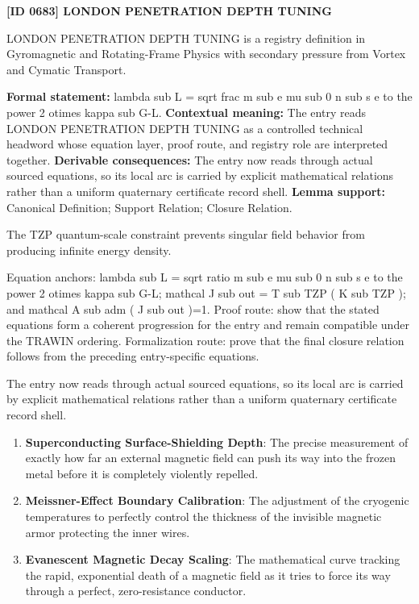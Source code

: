\clearpage
\noindent\textbf{[ID 0683] LONDON PENETRATION DEPTH TUNING}\par
\vspace{0.35em}
\begingroup\small
{}
LONDON PENETRATION DEPTH TUNING is a registry definition in Gyromagnetic and Rotating-Frame Physics with secondary pressure from Vortex and Cymatic Transport.

\begingroup\footnotesize\setlength{\emergencystretch}{3em}\sloppy
\textbf{Formal statement:} lambda sub L = sqrt frac m sub e mu sub 0 n sub s e to the power 2 otimes kappa sub G-L. \textbf{Contextual meaning:} The entry reads LONDON PENETRATION DEPTH TUNING as a controlled technical headword whose equation layer, proof route, and registry role are interpreted together. \textbf{Derivable consequences:} The entry now reads through actual sourced equations, so its local arc is carried by explicit mathematical relations rather than a uniform quaternary certificate record shell. \textbf{Lemma support:} Canonical Definition; Support Relation; Closure Relation.\par
\endgroup

The TZP quantum-scale constraint prevents singular field behavior from producing infinite energy density.

Equation anchors: lambda sub L = sqrt ratio m sub e mu sub 0 n sub s e to the power 2 otimes kappa sub G-L; mathcal J sub out = T sub TZP ( K sub TZP ); and mathcal A sub adm ( J sub out )=1. Proof route: show that the stated equations form a coherent progression for the entry and remain compatible under the TRAWIN ordering. Formalization route: prove that the final closure relation follows from the preceding entry-specific equations.

The entry now reads through actual sourced equations, so its local arc is carried by explicit mathematical relations rather than a uniform quaternary certificate record shell.
\endgroup

\begin{enumerate}[leftmargin=1.6em,itemsep=6pt,topsep=4pt]
\item \textbf{Superconducting Surface-Shielding Depth}: The precise measurement of exactly how far an external magnetic field can push its way into the frozen metal before it is completely violently repelled.
\item \textbf{Meissner-Effect Boundary Calibration}: The adjustment of the cryogenic temperatures to perfectly control the thickness of the invisible magnetic armor protecting the inner wires.
\item \textbf{Evanescent Magnetic Decay Scaling}: The mathematical curve tracking the rapid, exponential death of a magnetic field as it tries to force its way through a perfect, zero-resistance conductor.
\end{enumerate}

